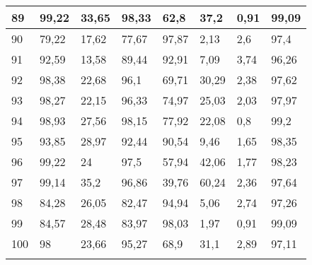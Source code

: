 \begin{longtable}[c]{|l|l|l|l|l|l|l|l|}
89              & 99,22        & 33,65        & 98,33       & 62,8          & 37,2          & 0,91          & 99,09         \\ \hline
90              & 79,22        & 17,62        & 77,67       & 97,87         & 2,13          & 2,6           & 97,4          \\ \hline
91              & 92,59        & 13,58        & 89,44       & 92,91         & 7,09          & 3,74          & 96,26         \\ \hline
92              & 98,38        & 22,68        & 96,1        & 69,71         & 30,29         & 2,38          & 97,62         \\ \hline
93              & 98,27        & 22,15        & 96,33       & 74,97         & 25,03         & 2,03          & 97,97         \\ \hline
94              & 98,93        & 27,56        & 98,15       & 77,92         & 22,08         & 0,8           & 99,2          \\ \hline
95              & 93,85        & 28,97        & 92,44       & 90,54         & 9,46          & 1,65          & 98,35         \\ \hline
96              & 99,22        & 24           & 97,5        & 57,94         & 42,06         & 1,77          & 98,23         \\ \hline
97              & 99,14        & 35,2         & 96,86       & 39,76         & 60,24         & 2,36          & 97,64         \\ \hline
98              & 84,28        & 26,05        & 82,47       & 94,94         & 5,06          & 2,74          & 97,26         \\ \hline
99              & 84,57        & 28,48        & 83,97       & 98,03         & 1,97          & 0,91          & 99,09         \\ \hline
100             & 98           & 23,66        & 95,27       & 68,9          & 31,1          & 2,89          & 97,11         \\ \hline
\label{anx:eucli}
\end{longtable}
